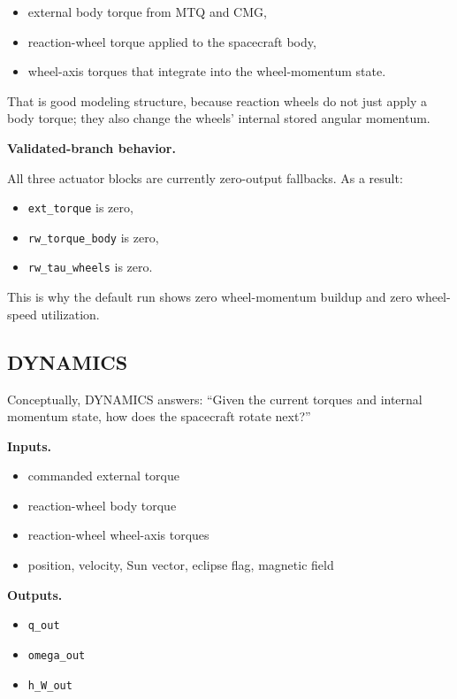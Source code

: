 \documentclass[11pt]{article}
\begin{document}
\begin{itemize}
\item external body torque from MTQ and CMG,
\item reaction-wheel torque applied to the spacecraft body,
\item wheel-axis torques that integrate into the wheel-momentum state.
\end{itemize}

That is good modeling structure, because reaction wheels do not just apply a body torque; they also change the wheels' internal stored angular momentum.

\textbf{Validated-branch behavior.}

All three actuator blocks are currently zero-output fallbacks. As a result:

\begin{itemize}
\item \texttt{ext\_torque} is zero,
\item \texttt{rw\_torque\_body} is zero,
\item \texttt{rw\_tau\_wheels} is zero.
\end{itemize}

This is why the default run shows zero wheel-momentum buildup and zero wheel-speed utilization.

\subsection{DYNAMICS}

Conceptually, DYNAMICS answers: ``Given the current torques and internal momentum state, how does the spacecraft rotate next?''

\textbf{Inputs.}

\begin{itemize}
\item commanded external torque
\item reaction-wheel body torque
\item reaction-wheel wheel-axis torques
\item position, velocity, Sun vector, eclipse flag, magnetic field
\end{itemize}

\textbf{Outputs.}

\begin{itemize}
\item \texttt{q\_out}
\item \texttt{omega\_out}
\item \texttt{h\_W\_out}
\end{itemize}
\end{document}
